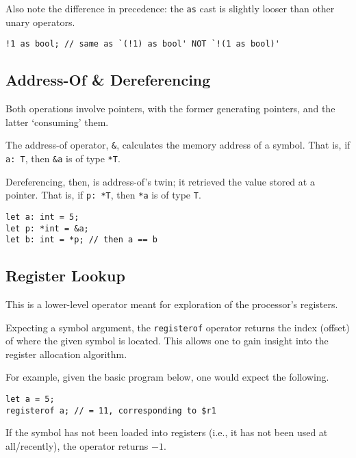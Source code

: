 \documentclass{article}
\begin{document}
    Also note the difference in precedence: the \texttt{as} cast is slightly looser than other unary operators.

    \begin{lstlisting}[language=CustomLang]
!1 as bool; // same as `(!1) as bool' NOT `!(1 as bool)'
    \end{lstlisting}

    \subsection{Address-Of \& Dereferencing}\label{subsec:address-of-&-dereferencing}

    Both operations involve pointers, with the former generating pointers, and the latter `consuming' them.

    The address-of operator, \texttt{\&}, calculates the memory address of a symbol.
    That is, if \texttt{a: T}, then \texttt{\&a} is of type \texttt{*T}.

    Dereferencing, then, is address-of's twin; it retrieved the value stored at a pointer.
    That is, if \texttt{p: *T}, then \texttt{*a} is of type \texttt{T}.

    \begin{lstlisting}[language=CustomLang]
let a: int = 5;
let p: *int = &a;
let b: int = *p; // then a == b
    \end{lstlisting}

    \subsection{Register Lookup}

    This is a lower-level operator meant for exploration of the processor's registers.

    Expecting a symbol argument, the \texttt{registerof} operator returns the index (offset) of where the given symbol is located.
    This allows one to gain insight into the register allocation algorithm.

    For example, given the basic program below, one would expect the following.

    \begin{lstlisting}[language=CustomLang]
let a = 5;
registerof a; // = 11, corresponding to $r1
    \end{lstlisting}

    If the symbol has not been loaded into registers (i.e., it has not been used at all/recently), the operator returns \(-1\).
\end{document}
